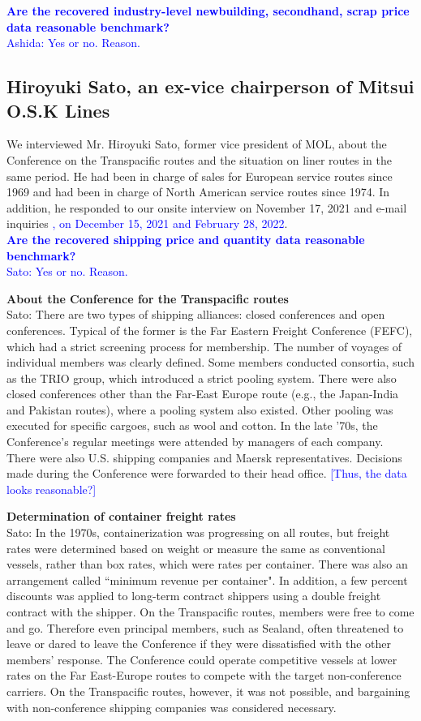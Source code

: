 \textcolor{blue}{
\textbf{Are the recovered industry-level newbuilding, secondhand, scrap price data reasonable benchmark?} \\
Ashida: Yes or no. Reason.
}

\subsection{Hiroyuki Sato, an ex-vice chairperson of Mitsui O.S.K Lines}

We interviewed Mr. Hiroyuki Sato, former vice president of MOL, about the Conference on the Transpacific routes and the situation on liner routes in the same period. He had been in charge of sales for European service routes since 1969 and had been in charge of North American service routes since 1974. In addition, he responded to our onsite interview on November 17, 2021 and e-mail inquiries  \textcolor{blue}{, on December 15, 2021 and February 28, 2022}.\\

\textcolor{blue}{\textbf{Are the recovered shipping price and quantity data reasonable benchmark?} \\
Sato: Yes or no. Reason.
}

\textbf{About the  Conference for the Transpacific routes} \\
Sato: There are two types of shipping alliances: closed conferences and open conferences. Typical of the former is the Far Eastern Freight Conference (FEFC), which had a strict screening process for membership. The number of voyages of individual members was clearly defined. Some members conducted consortia, such as the TRIO group, which introduced a strict pooling system. There were also closed conferences other than the Far-East Europe route (e.g., the Japan-India and Pakistan routes), where a pooling system also existed. Other pooling was executed for specific cargoes, such as wool and cotton. In the late '70s, the Conference's regular meetings were attended by managers of each company. There were also U.S. shipping companies and Maersk representatives. Decisions made during the Conference were forwarded to their head office. \textcolor{blue}{[Thus, the data looks reasonable?]}

\textbf{Determination of container freight rates} \\
Sato: In the 1970s, containerization was progressing on all routes, but freight rates were determined based on weight or measure the same as conventional vessels, rather than box rates, which were rates per container. There was also an arrangement called ``minimum revenue per container". In addition, a few percent discounts was applied to long-term contract shippers using a double freight contract with the shipper. On the Transpacific routes, members were free to come and go. Therefore even principal members, such as Sealand, often threatened to leave or dared to leave the Conference if they were dissatisfied with the other members' response. The Conference could operate competitive vessels at lower rates on the Far East-Europe routes to compete with the target non-conference carriers. On the Transpacific routes, however, it was not possible, and bargaining with non-conference shipping companies was considered necessary.

